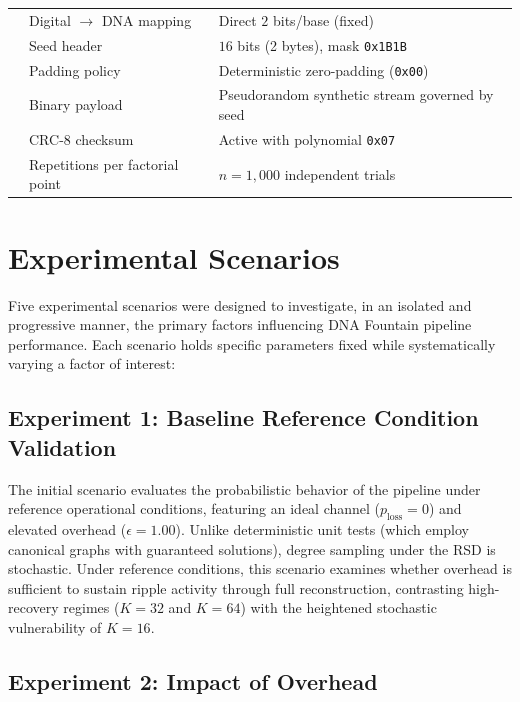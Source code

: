 \begin{table}[htbp]
{\begin{tabular}{llp{7.5cm}}
            & Digital $\to$ DNA mapping & Direct $2$ bits/base (fixed) \\
            & Seed header & $16$ bits (2 bytes), mask \texttt{0x1B1B} \\
            & Padding policy & Deterministic zero-padding (\texttt{0x00}) \\
            & Binary payload & Pseudorandom synthetic stream governed by seed \\
            & CRC-8 checksum & Active with polynomial \texttt{0x07} \\
            & Repetitions per factorial point & $n = 1{,}000$ independent trials \\
        \bottomrule
    \end{tabular}%
    }
\end{table}

\section{Experimental Scenarios}
\label{sec:experimental_scenarios}

Five experimental scenarios were designed to investigate, in an isolated and progressive manner, the primary factors influencing DNA Fountain pipeline performance. Each scenario holds specific parameters fixed while systematically varying a factor of interest:

\subsection{Experiment 1: Baseline Reference Condition Validation}

The initial scenario evaluates the probabilistic behavior of the pipeline under reference operational conditions, featuring an ideal channel ($p_{\text{loss}} = 0$) and elevated overhead ($\epsilon = 1.00$). Unlike deterministic unit tests (which employ canonical graphs with guaranteed solutions), degree sampling under the RSD is stochastic. Under reference conditions, this scenario examines whether overhead is sufficient to sustain ripple activity through full reconstruction, contrasting high-recovery regimes ($K=32$ and $K=64$) with the heightened stochastic vulnerability of $K=16$.

\subsection{Experiment 2: Impact of Overhead}

